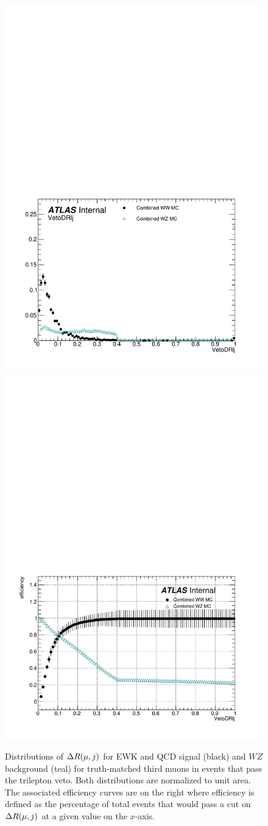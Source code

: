 \begin{figure}[htbp]
  \centering      
  \includegraphics[width=.48\textwidth]{figs/ssww_13tev/custom_or/veto_muon_VetoDRlj}
  \includegraphics[width=.48\textwidth]{figs/ssww_13tev/custom_or/ROC_veto_muon_VetoDRlj}\\
  \caption{Distributions of $\Delta R(\mu,j)$ for EWK and QCD \ssww signal (black) and $WZ$ background (teal) for truth-matched third muons in events that pass the trilepton veto.  Both distributions are normalized to unit area.  The associated efficiency curves are on the right where efficiency is defined as the percentage of total events that would pass a cut on $\Delta R(\mu,j)$ at a given value on the $x$-axis.}
  \label{fig:ssww13tev_drlj_muon}
\end{figure}

